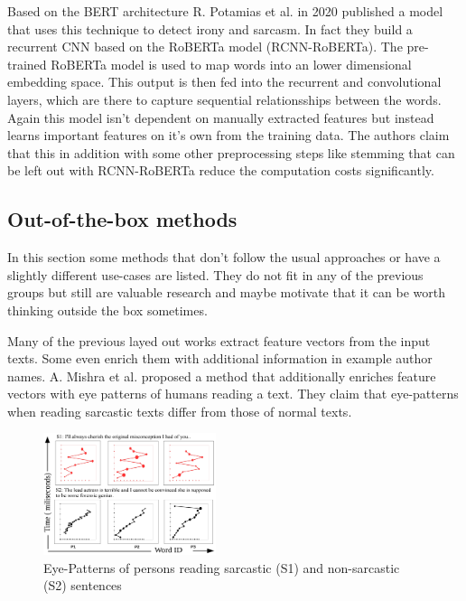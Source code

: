 \documentclass[sigconf,  review=false, nonacm=true]{acmart}
\begin{document}
Based on the BERT architecture R. Potamias et al. in 2020 \cite{A-Transformer-based-approach-to-Irony-and-Sarcasm-detection} published a model that uses this technique to detect irony and sarcasm. In fact they build a recurrent CNN based on the RoBERTa model (RCNN-RoBERTa). The pre-trained RoBERTa model is used to map words into an lower dimensional embedding space. This output is then fed into the recurrent and convolutional layers, which are there to capture sequential relationsships between the words. Again this model isn't dependent on manually extracted features but instead learns important features on it's own from the training data. The authors claim that this in addition with some other preprocessing steps like stemming that can be left out with RCNN-RoBERTa reduce the computation costs significantly.


\subsection{Out-of-the-box methods}

In this section some methods that don't follow the usual approaches or have a slightly different use-cases are listed. They do not fit in any of the previous groups but still are valuable research and maybe motivate that it can be worth thinking outside the box sometimes.

Many of the previous layed out works extract feature vectors from the input texts. Some even enrich them with additional information in example author names. A. Mishra et al. \cite{eye-patterns} proposed a method that additionally enriches feature vectors with eye patterns of humans reading a text. They claim that eye-patterns when reading sarcastic texts differ from those of normal texts. 

\begin{figure}[H]
    \centering
    \includegraphics[width=0.45\textwidth]{./sources/eye_patterns}
    \caption{Eye-Patterns of persons reading sarcastic (S1) and non-sarcastic (S2) sentences \cite{eye-patterns}}
    \label{fig:eye_patterns}
\end{figure}
\end{document}

